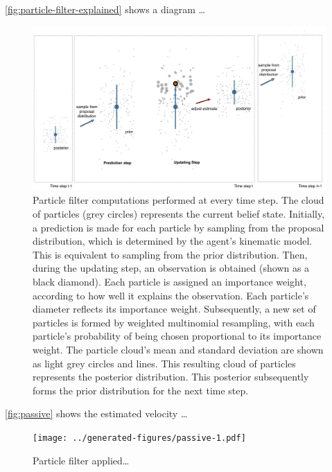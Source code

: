 \documentclass[english,floatsintext,man]{apa6}
\theoremstyle{definition}
\theoremstyle{definition}
\theoremstyle{remark}
\begin{document}
\autoref{fig:particle-filter-explained} shows a diagram \ldots{}

\begin{figure}
\includegraphics[width=1\linewidth]{diagrams/figure-particle-filter-explained} \caption{Particle filter computations performed at every time step. The cloud of particles (grey circles) represents the current belief state. Initially, a prediction is made for each particle by sampling from the proposal distribution, which is determined by the agent’s kinematic model. This is equivalent to sampling from the prior distribution. Then, during the updating step, an observation  is obtained (shown as a black diamond). Each particle is assigned an importance weight, according to how well it explains the observation. Each particle's diameter reflects its importance weight. Subsequently, a new set of particles is formed by weighted multinomial resampling, with each particle's probability of being chosen proportional to its importance weight. The particle cloud's mean and standard deviation are shown as light grey circles and lines. This resulting cloud of particles represents the posterior distribution. This posterior subsequently forms the prior distribution for the next time step.}\label{fig:particle-filter-explained}
\end{figure}

\autoref{fig:passive} shows the estimated velocity \ldots{}

\begin{no-prefix-figure-caption}

\begin{figure}
\centering
\texttt{[image: ../generated-figures/passive-1.pdf]}
\caption{\label{fig:passive}Particle filter applied\ldots{}}
\end{figure}

\end{no-prefix-figure-caption}
\end{document}
